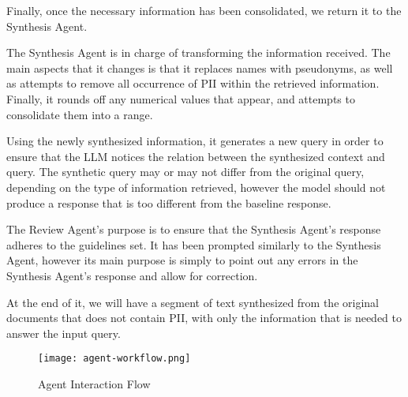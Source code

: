 Finally, once the necessary information has been consolidated, we return it to the Synthesis Agent.

The Synthesis Agent is in charge of transforming the information received. The main aspects that it changes is that it replaces names with pseudonyms, as well as attempts to remove all occurrence of PII within the retrieved information. Finally, it rounds off any numerical values that appear, and attempts to consolidate them into a range.

Using the newly synthesized information, it generates a new query in order to ensure that the LLM notices the relation between the synthesized context and query. The synthetic query may or may not differ from the original query, depending on the type of information retrieved, however the model should not produce a response that is too different from the baseline response.

The Review Agent's purpose is to ensure that the Synthesis Agent's response adheres to the guidelines set. It has been prompted similarly to the Synthesis Agent, however its main purpose is simply to point out any errors in the Synthesis Agent's response and allow for correction.

At the end of it, we will have a segment of text synthesized from the original documents that does not contain PII, with only the information that is needed to answer the input query.

\begin{figure}
	\centering
	\texttt{[image: agent-workflow.png]}
	\caption{Agent Interaction Flow}
	\label{fig:AgentInteraction}
\end{figure}

